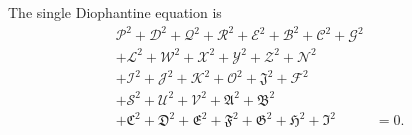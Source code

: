 The single Diophantine equation is
\[
\begin{split}
\mathcal{P}^2+\mathcal{D}^2+\mathcal{Q}^2+\mathcal{R}^2+\mathcal{E}^2+\mathcal{B}^2+\mathcal{C}^2+\mathcal{G}^2 &\\
+\mathcal{L}^2+\mathcal{W}^2+\mathcal{X}^2+\mathcal{Y}^2+\mathcal{Z}^2+\mathcal{N}^2 &\\
+\mathcal{I}^2+\mathcal{J}^2+\mathcal{K}^2+\mathcal{O}^2+\mathfrak{J}^2+\mathcal{F}^2 &\\
+\mathcal{S}^2+\mathcal{U}^2+\mathcal{V}^2+\mathfrak{A}^2+\mathfrak{B}^2 &\\
+\mathfrak{C}^2+\mathfrak{D}^2+\mathfrak{E}^2+\mathfrak{F}^2+\mathfrak{G}^2+\mathfrak{H}^2+\mathfrak{I}^2 &= 0.
\end{split}
\]
